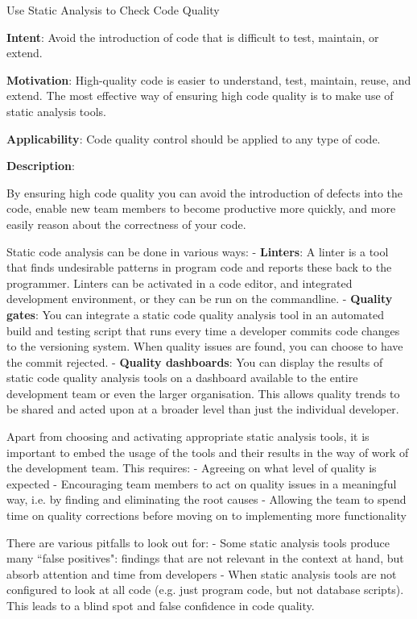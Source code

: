   
  \begin{frame}[plain]{ Use Static Analysis to Check Code Quality
 }

  \textbf{Intent}: Avoid the introduction of code that is difficult to test, maintain, or extend. 
 

  \textbf{Motivation}: High-quality code is easier to understand, test, maintain, reuse, and extend. The most effective way of ensuring high code quality is to make use of static analysis tools. 
 

  \textbf{Applicability}: Code quality control should be applied to any type of code. 
 

  \textbf{Description}: 

By ensuring high code quality you can avoid the introduction of defects into the code, enable new team members to become productive more quickly, and more easily reason about the correctness of your code.


Static code analysis can be done in various ways:
- \textbf{Linters}: A linter is a tool that finds undesirable patterns in program code and reports these back to the programmer. Linters can be activated in a code editor, and integrated development environment, or they can be run on the commandline.
- \textbf{Quality gates}: You can integrate a static code quality analysis tool in an automated build and testing script that runs every time a developer commits code changes to the versioning system. When quality issues are found, you can choose to have the commit rejected.
- \textbf{Quality dashboards}: You can display the results of static code quality analysis tools on a dashboard available to the entire development team or even the larger organisation. This allows quality trends to be shared and acted upon at a broader level than just the individual developer.


Apart from choosing and activating appropriate static analysis tools, it is important to embed the usage of the tools and their results in the way of work of the development team. This requires:
- Agreeing on what level of quality is expected
- Encouraging team members to act on quality issues in a meaningful way, i.e. by finding and eliminating the root causes
- Allowing the team to spend time on quality corrections before moving on to implementing more functionality


There are various pitfalls to look out for:
- Some static analysis tools produce many ``false positives": findings that are not relevant in the context at hand, but absorb attention and time from developers
- When static analysis tools are not configured to look at all code (e.g. just program code, but not database scripts). This leads to a blind spot and false confidence in code quality.


 


  \end{frame}


